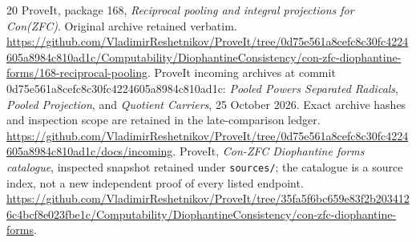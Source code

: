 \documentclass[11pt]{article}
\begin{document}
\begin{thebibliography}{20}
 ProveIt, package 168, \emph{Reciprocal pooling and integral
projections for Con(ZFC)}. Original archive retained verbatim.
\url{https://github.com/VladimirReshetnikov/ProveIt/tree/0d75e561a8cefc8c30fc4224605a8984c810ad1c/Computability/DiophantineConsistency/con-zfc-diophantine-forms/168-reciprocal-pooling}.
 ProveIt incoming archives at commit
0d75e561a8cefc8c30fc4224605a8984c810ad1c:
\emph{Pooled Powers Separated Radicals}, \emph{Pooled Projection},
and \emph{Quotient Carriers}, 25 October 2026. Exact archive hashes and
inspection scope are retained in the late-comparison ledger.
\url{https://github.com/VladimirReshetnikov/ProveIt/tree/0d75e561a8cefc8c30fc4224605a8984c810ad1c/docs/incoming}.
 ProveIt, \emph{Con-ZFC Diophantine forms catalogue},
inspected snapshot retained under \texttt{sources/}; the catalogue is a
source index, not a new independent proof of every listed endpoint.
\url{https://github.com/VladimirReshetnikov/ProveIt/tree/35fa5f6bc659e83f2b2034126c4bcf8e023fbe1c/Computability/DiophantineConsistency/con-zfc-diophantine-forms}.
\end{thebibliography}
\end{document}
